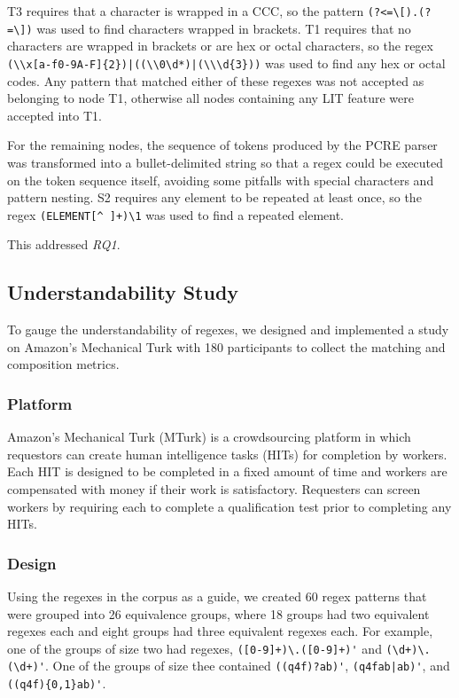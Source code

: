 T3 requires that a character is wrapped in a CCC, so the pattern \verb!(?<=\[).(?=\])! was used to find characters wrapped in brackets.  T1 requires that no characters are wrapped in brackets or are hex or octal characters, so the regex \verb!(\\x[a-f0-9A-F]{2})|((\\0\d*)|(\\\d{3}))! was used to find any hex or octal codes.  Any pattern that matched either of these regexes was not accepted as belonging to node T1, otherwise all nodes containing any LIT feature were accepted into T1.

For the remaining nodes, the sequence of tokens produced by the PCRE parser was transformed into a bullet-delimited string so that a regex could be executed on the token sequence itself, avoiding some pitfalls with special characters and pattern nesting.  S2 requires any element to be repeated at least once, so the regex \verb!(ELEMENT!\textbullet\verb![^ ]+)\1! was used to find a repeated element.


This addressed \emph{RQ1}.

\subsection{Understandability Study}
To gauge the understandability of regexes, we designed and implemented a study on Amazon's Mechanical Turk with 180 participants to collect the matching and composition metrics.

\subsubsection{Platform}
Amazon's Mechanical Turk (MTurk) is a crowdsourcing platform in which requestors can create human intelligence tasks (HITs) for completion by workers. Each HIT is designed to be completed in a fixed amount of time and workers are compensated with money if their work is satisfactory. Requesters can screen workers by requiring each to complete a qualification test prior to completing any HITs.

\subsubsection{Design}
Using the regexes in the corpus as a guide, we created 60 regex patterns that were grouped into 26 equivalence groups, where 18 groups had two equivalent regexes each and eight groups had three equivalent regexes each. For example, one of the groups of size two had regexes, \verb!([0-9]+)\.([0-9]+)'! and \verb!(\d+)\.(\d+)'!. One of the groups of size thee contained \verb!((q4f)?ab)'!, \verb!(q4fab|ab)'!, and \verb!((q4f){0,1}ab)'!.

